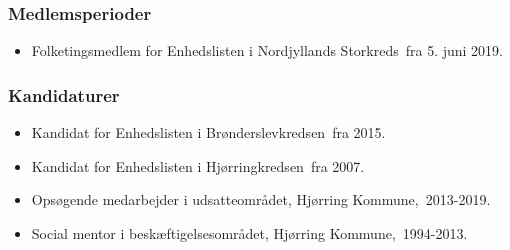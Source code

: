 \documentclass[11pt, a4paper]{awesome-cv}
\begin{document}
\begin{cvletter}
\subsubsection*{Medlemsperioder}
\begin{itemize}
\item Folketingsmedlem for Enhedslisten i Nordjyllands Storkreds fra 5. juni 2019.
\end{itemize}
\subsubsection*{Kandidaturer}
\begin{itemize}
\item Kandidat for Enhedslisten i Brønderslevkredsen fra 2015.
\item Kandidat for Enhedslisten i Hjørringkredsen fra 2007.
\end{itemize}
\begin{itemize}
\item Opsøgende medarbejder i udsatteområdet, Hjørring Kommune, 2013-2019.
\item Social mentor i beskæftigelsesområdet, Hjørring Kommune, 1994-2013.
\end{itemize}
\end{cvletter}
\end{document}

